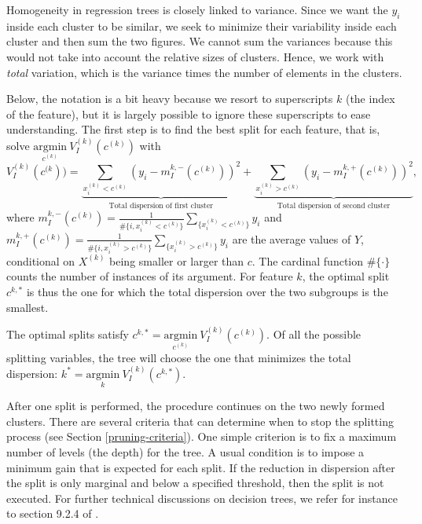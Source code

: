 \documentclass[]{krantz}
\theoremstyle{definition}
\theoremstyle{definition}
\theoremstyle{definition}
\theoremstyle{remark}
\begin{document}
Homogeneity in regression trees is closely linked to variance. Since we
want the \(y_i\) inside each cluster to be similar, we seek to minimize
their variability inside each cluster and then sum the two figures. We
cannot sum the variances because this would not take into account the
relative sizes of clusters. Hence, we work with \emph{total} variation,
which is the variance times the number of elements in the clusters.

Below, the notation is a bit heavy because we resort to superscripts
\(k\) (the index of the feature), but it is largely possible to ignore
these superscripts to ease understanding. The first step is to find the
best split for each feature, that is, solve
\(\underset{c^{(k)}}{\text{argmin}} \ V^{(k)}_I(c^{(k)})\) with
\begin{equation}
\label{eq:node}
V^{(k)}_I(c^{(k}))= \underbrace{\sum_{x_i^{(k)}<c^{(k)}}\left(y_i-m_I^{k,-}(c^{(k)}) \right)^2}_{\text{Total dispersion of first cluster}} + \underbrace{\sum_{x_i^{(k)}>c^{(k)}}\left(y_i-m_I^{k,+}(c^{(k)}) \right)^2}_{\text{Total dispersion of second cluster}},
\end{equation} where
\(m_I^{k,-}(c^{(k)})=\frac{1}{\#\{i,x_i^{(k)}<c^{(k)} \}}\sum_{\{x_i^{(k)}<c^{(k)} \}}y_i\)
and
\(m_I^{k,+}(c^{(k)})=\frac{1}{\#\{i,x_i^{(k)}>c^{(k)} \}}\sum_{\{x_i^{(k)}>c^{(k)} \}}y_i\)
are the average values of \(Y\), conditional on \(X^{(k)}\) being
smaller or larger than \(c\). The cardinal function \(\#\{\cdot\}\)
counts the number of instances of its argument. For feature \(k\), the
optimal split \(c^{k,*}\) is thus the one for which the total dispersion
over the two subgroups is the smallest.

The optimal splits satisfy
\(c^{k,*}= \underset{c^{(k)}}{\text{argmin}} \ V^{(k)}_I(c^{(k)})\). Of
all the possible splitting variables, the tree will choose the one that
minimizes the total dispersion:
\(k^*=\underset{k}{\text{argmin}} \ V^{(k)}_I(c^{k,*})\).

After one split is performed, the procedure continues on the two newly
formed clusters. There are several criteria that can determine when to
stop the splitting process (see Section \ref{pruning-criteria}). One
simple criterion is to fix a maximum number of levels (the depth) for
the tree. A usual condition is to impose a minimum gain that is expected
for each split. If the reduction in dispersion after the split is only
marginal and below a specified threshold, then the split is not
executed. For further technical discussions on decision trees, we refer
for instance to section 9.2.4 of \citet{friedman2009elements}.
\end{document}
